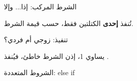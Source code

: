 \documentclass[aspectratio=169, 11pt, t, xcolor={table}]{beamer}
\begin{document}
\begin{frame}{الشرط المركب: إذا... وإلا}
    \begin{center}
    \begin{minipage}{0.62\textwidth}
    \end{minipage}
    \end{center}
    \vspace{0.3cm}
    تُنفذ \textbf{إحدى} الكتلتين فقط، حسب قيمة الشرط.
\end{frame}

\begin{frame}{تنفيذ: زوجي أم فردي؟}
    \vspace{0.6cm}
    \begin{center}
        \begin{minipage}{0.45\textwidth}
        \end{minipage}
    \end{center}
    \vspace{0.3cm}
     يساوي \textenglish{1}، إذن الشرط  خاطئ، فيُنفذ .
\end{frame}

\begin{frame}{الشروط المتعددة: \textenglish{else if}}
    \begin{center}
    \begin{minipage}{0.62\textwidth}
    \end{minipage}
    \end{center}
\end{frame}
\end{document}
